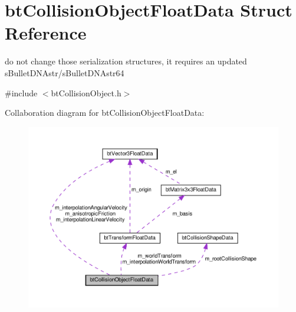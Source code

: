 \hypertarget{structbtCollisionObjectFloatData}{}\section{bt\+Collision\+Object\+Float\+Data Struct Reference}
\label{structbtCollisionObjectFloatData}


do not change those serialization structures, it requires an updated s\+Bullet\+D\+N\+Astr/s\+Bullet\+D\+N\+Astr64  




{\ttfamily \#include $<$bt\+Collision\+Object.\+h$>$}



Collaboration diagram for bt\+Collision\+Object\+Float\+Data\+:
\nopagebreak
\begin{figure}[H]
\begin{center}
\leavevmode
\includegraphics[width=350pt]{structbtCollisionObjectFloatData__coll__graph}
\end{center}
\end{figure}
